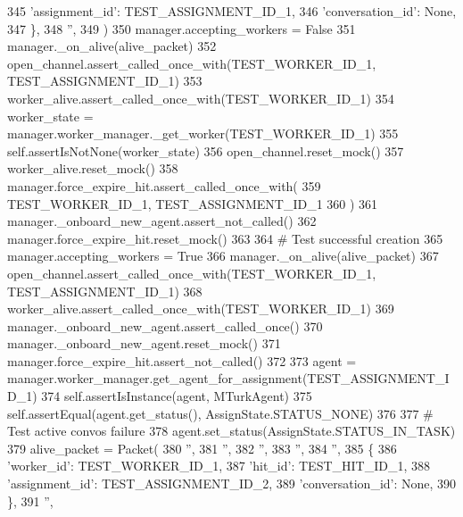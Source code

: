 \begin{DoxyCode}
345                 \textcolor{stringliteral}{'assignment\_id'}: TEST\_ASSIGNMENT\_ID\_1,
346                 \textcolor{stringliteral}{'conversation\_id'}: \textcolor{keywordtype}{None},
347             \},
348             \textcolor{stringliteral}{''},
349         )
350         manager.accepting\_workers = \textcolor{keyword}{False}
351         manager.\_on\_alive(alive\_packet)
352         open\_channel.assert\_called\_once\_with(TEST\_WORKER\_ID\_1, TEST\_ASSIGNMENT\_ID\_1)
353         worker\_alive.assert\_called\_once\_with(TEST\_WORKER\_ID\_1)
354         worker\_state = manager.worker\_manager.\_get\_worker(TEST\_WORKER\_ID\_1)
355         self.assertIsNotNone(worker\_state)
356         open\_channel.reset\_mock()
357         worker\_alive.reset\_mock()
358         manager.force\_expire\_hit.assert\_called\_once\_with(
359             TEST\_WORKER\_ID\_1, TEST\_ASSIGNMENT\_ID\_1
360         )
361         manager.\_onboard\_new\_agent.assert\_not\_called()
362         manager.force\_expire\_hit.reset\_mock()
363 
364         \textcolor{comment}{# Test successful creation}
365         manager.accepting\_workers = \textcolor{keyword}{True}
366         manager.\_on\_alive(alive\_packet)
367         open\_channel.assert\_called\_once\_with(TEST\_WORKER\_ID\_1, TEST\_ASSIGNMENT\_ID\_1)
368         worker\_alive.assert\_called\_once\_with(TEST\_WORKER\_ID\_1)
369         manager.\_onboard\_new\_agent.assert\_called\_once()
370         manager.\_onboard\_new\_agent.reset\_mock()
371         manager.force\_expire\_hit.assert\_not\_called()
372 
373         agent = manager.worker\_manager.get\_agent\_for\_assignment(TEST\_ASSIGNMENT\_ID\_1)
374         self.assertIsInstance(agent, MTurkAgent)
375         self.assertEqual(agent.get\_status(), AssignState.STATUS\_NONE)
376 
377         \textcolor{comment}{# Test active convos failure}
378         agent.set\_status(AssignState.STATUS\_IN\_TASK)
379         alive\_packet = Packet(
380             \textcolor{stringliteral}{''},
381             \textcolor{stringliteral}{''},
382             \textcolor{stringliteral}{''},
383             \textcolor{stringliteral}{''},
384             \textcolor{stringliteral}{''},
385             \{
386                 \textcolor{stringliteral}{'worker\_id'}: TEST\_WORKER\_ID\_1,
387                 \textcolor{stringliteral}{'hit\_id'}: TEST\_HIT\_ID\_1,
388                 \textcolor{stringliteral}{'assignment\_id'}: TEST\_ASSIGNMENT\_ID\_2,
389                 \textcolor{stringliteral}{'conversation\_id'}: \textcolor{keywordtype}{None},
390             \},
391             \textcolor{stringliteral}{''},

\end{DoxyCode}
